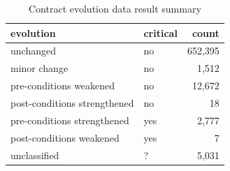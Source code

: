 \begin{table}[]
\centering
\caption{Contract evolution data result summary}
\label{tab:results-evolution}
\begin{tabular}{|l|l|r|} \hline
   evolution & critical & count \\ \hline
   unchanged & no & 652,395  \\
   minor change & no & 1,512  \\
   pre-conditions weakened & no & 12,672  \\
   post-conditions strengthened & no & 18  \\ \hline
   pre-conditions strengthened & yes & 2,777  \\
   post-conditions weakened & yes & 7  \\ \hline
   unclassified & ? & 5,031  \\ \hline
\end{tabular}
\end{table}
